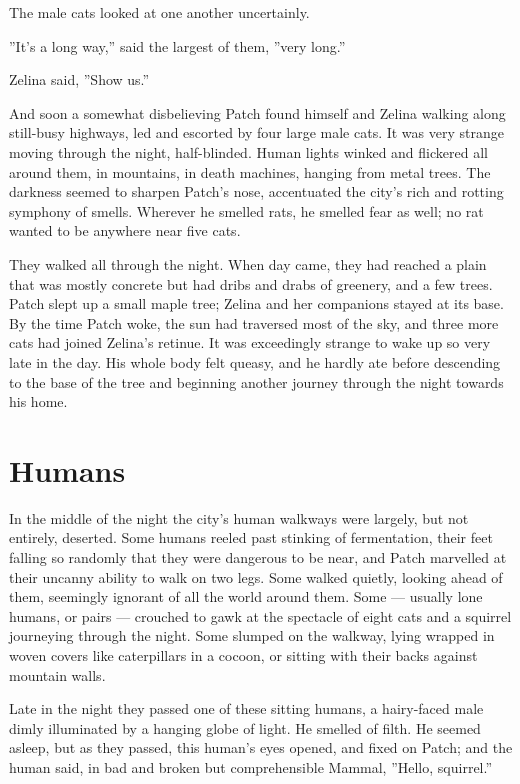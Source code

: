 \documentclass[12pt]{book}
\begin{document}
The male cats looked at one another uncertainly.

''It's a long way,'' said the largest of them, ''very long.''

Zelina said, ''Show us.''

And soon a somewhat disbelieving Patch found himself and Zelina walking along still-busy highways, led and escorted by four large male cats. It was very strange moving through the night, half-blinded. Human lights winked and flickered all around them, in mountains, in death machines, hanging from metal trees. The darkness seemed to sharpen Patch's nose, accentuated the city's rich and rotting symphony of smells. Wherever he smelled rats, he smelled fear as well; no rat wanted to be anywhere near five cats.

They walked all through the night. When day came, they had reached a plain that was mostly concrete but had dribs and drabs of greenery, and a few trees. Patch slept up a small maple tree; Zelina and her companions stayed at its base. By the time Patch woke, the sun had traversed most of the sky, and three more cats had joined Zelina's retinue. It was exceedingly strange to wake up so very late in the day. His whole body felt queasy, and he hardly ate before descending to the base of the tree and beginning another journey through the night towards his home.


\section{Humans}

In the middle of the night the city's human walkways were largely, but not entirely, deserted. Some humans reeled past stinking of fermentation, their feet falling so randomly that they were dangerous to be near, and Patch marvelled at their uncanny ability to walk on two legs. Some walked quietly, looking ahead of them, seemingly ignorant of all the world around them. Some ---
usually lone humans, or pairs ---
crouched to gawk at the spectacle of eight cats and a squirrel journeying through the night. Some slumped on the walkway, lying wrapped in woven covers like caterpillars in a cocoon, or sitting with their backs against mountain walls.

Late in the night they passed one of these sitting humans, a hairy-faced male dimly illuminated by a hanging globe of light. He smelled of filth. He seemed asleep, but as they passed, this human's eyes opened, and fixed on Patch; and the human said, in bad and broken but comprehensible Mammal, ''Hello, squirrel.''
\end{document}
